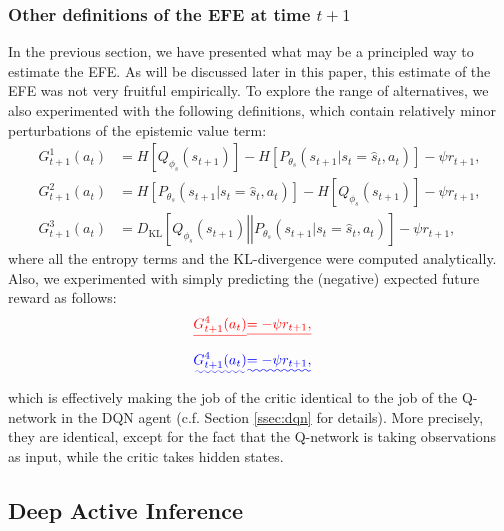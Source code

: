 \documentclass[twoside,11pt]{article}
\newcommand{\kl}[2]{D_{\mathrm{KL}} \left[ \left. \left. #1 \right|\right| #2 \right] }
\providecommand{\DIFadd}[1]{{\protect\color{blue}\uwave{#1}}} %
\providecommand{\DIFdel}[1]{{\protect\color{red}\sout{#1}}}                      %
\providecommand{\DIFaddbegin}{} %
\providecommand{\DIFaddend}{} %
\providecommand{\DIFdelbegin}{} %
\providecommand{\DIFdelend}{} %
\begin{document}
\subsubsection{Other definitions of the EFE at time $t + 1$} \label{ssec:efe_other_defe}

In the previous section, we have presented what may be a principled way to estimate the EFE. As will be discussed later in this paper, this estimate of the EFE was not very fruitful empirically. To explore the range of alternatives, we also experimented with the following definitions, which contain relatively minor perturbations of the epistemic value term:
\begin{align*}
G^1_{t+1}(a_t) &= H[Q_{\phi_s}(s_{t+1})] - H[P_{\theta_s}(s_{t+1}|s_t =\hat{s}_t, a_t)] - \psi r_{t+1},\\
G^2_{t+1}(a_t) &= H[P_{\theta_s}(s_{t+1}|s_t =\hat{s}_t, a_t)] - H[Q_{\phi_s}(s_{t+1})] - \psi r_{t+1},\\
G^3_{t+1}(a_t) &= \kl{Q_{\phi_s}(s_{t+1})}{P_{\theta_s}(s_{t+1}|s_t = \hat{s}_t, a_t)} - \psi r_{t+1},
\end{align*}
where all the entropy terms and the KL-divergence were computed analytically. Also, we experimented with simply predicting the (negative) expected future reward as follows:
\DIFdelbegin \begin{align*}
\DIFdel{G^4_{t+1}(a_t) }&\DIFdel{= - \psi r_{t+1},
}\end{align*}%
\DIFdelend \DIFaddbegin \begin{align}
\DIFadd{G^4_{t+1}(a_t) }&\DIFadd{= - \psi r_{t+1},\label{eq:reward_maximisation}
}\end{align}\DIFaddend 
which is effectively making the job of the critic identical to the job of the Q-network in the DQN agent (c.f. Section \ref{ssec:dqn} for details). More precisely, they are identical, except for the fact that the Q-network is taking observations as input, while the critic takes hidden states. 

\subsection{Deep Active Inference} \label{ssec:DAI}
\end{document}

